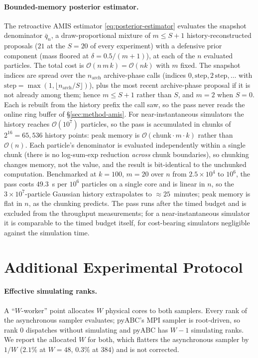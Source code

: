 \documentclass[10pt]{article}
\theoremstyle{plain}
\theoremstyle{definition}
\begin{document}
\paragraph{Bounded-memory posterior estimator.} The retroactive AMIS estimator \eqref{eq:posterior-estimator} evaluates the snapshot denominator $\bar q_n$, a draw-proportional mixture of $m\le S{+}1$ history-reconstructed proposals ($21$ at the $S=20$ of every experiment) with a defensive prior component (mass floored at $\delta=0.5/(m{+}1)$), at each of the $n$ evaluated particles. The total cost is $\mathcal{O}(n\,m\,k)=\mathcal{O}(nk)$ with $m$ fixed. The snapshot indices are spread over the $n_{\text{arch}}$ archive-phase calls (indices $0,\text{step},2\,\text{step},\dots$ with $\text{step}=\max(1,\lfloor n_{\text{arch}}/S\rfloor)$), plus the most recent archive-phase proposal if it is not already among them; hence $m\le S{+}1$ rather than $S$, and $m=2$ when $S=0$. Each is rebuilt from the history prefix the call saw, so the pass never reads the online ring buffer of \S\ref{sec:method-amis}. For near-instantaneous simulators the history reaches $\mathcal{O}(10^7)$ particles, so the pass is accumulated in chunks of $2^{16}=65{,}536$ history points: peak memory is $\mathcal{O}(\text{chunk}\cdot m\cdot k)$ rather than $\mathcal{O}(n)$. Each particle's denominator is evaluated independently within a single chunk (there is no log-sum-exp reduction \emph{across} chunk boundaries), so chunking changes memory, not the value, and the result is bit-identical to the unchunked computation. Benchmarked at $k=100$, $m=20$ over $n$ from $2.5\times10^4$ to $10^6$, the pass costs $49.3$~s per $10^6$ particles on a single core and is linear in $n$, so the $3\times10^7$-particle Gaussian history extrapolates to ${\approx}25$~minutes; peak memory is flat in $n$, as the chunking predicts. The pass runs after the timed budget and is excluded from the throughput measurements; for a near-instantaneous simulator it is comparable to the timed budget itself, for cost-bearing simulators negligible against the simulation time.

\section{Additional Experimental Protocol}\label{app:protocol}

\paragraph{Effective simulating ranks.} A ``$W$-worker'' point allocates $W$ physical cores to both samplers. Every rank of the asynchronous sampler evaluates; pyABC's MPI sampler is root-driven, so rank $0$ dispatches without simulating and pyABC has $W{-}1$ simulating ranks. We report the allocated $W$ for both, which flatters the asynchronous sampler by $1/W$ ($2.1\%$ at $W{=}48$, $0.3\%$ at $384$) and is not corrected.
\end{document}
